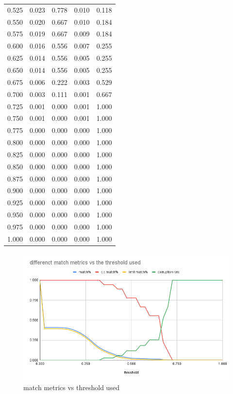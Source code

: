 \documentclass{article}
\begin{document}
\begin{table}[H]
\begin{tabular}{
  >{\columncolor[HTML]{FFE599}}c 
  >{\columncolor[HTML]{B6D7A8}}c 
  >{\columncolor[HTML]{9FC5E8}}c 
  >{\columncolor[HTML]{F9CB9C}}c 
  >{\columncolor[HTML]{D9D2E9}}c }
  0.525 & 0.023 & 0.778 & 0.010 & 0.118 \\
  0.550 & 0.020 & 0.667 & 0.010 & 0.184 \\
  0.575 & 0.019 & 0.667 & 0.009 & 0.184 \\
  0.600 & 0.016 & 0.556 & 0.007 & 0.255 \\
  0.625 & 0.014 & 0.556 & 0.005 & 0.255 \\
  0.650 & 0.014 & 0.556 & 0.005 & 0.255 \\
  0.675 & 0.006 & 0.222 & 0.003 & 0.529 \\
  0.700 & 0.003 & 0.111 & 0.001 & 0.667 \\
  0.725 & 0.001 & 0.000 & 0.001 & 1.000 \\
  0.750 & 0.001 & 0.000 & 0.001 & 1.000 \\
  0.775 & 0.000 & 0.000 & 0.000 & 1.000 \\
  0.800 & 0.000 & 0.000 & 0.000 & 1.000 \\
  0.825 & 0.000 & 0.000 & 0.000 & 1.000 \\
  0.850 & 0.000 & 0.000 & 0.000 & 1.000 \\
  0.875 & 0.000 & 0.000 & 0.000 & 1.000 \\
  0.900 & 0.000 & 0.000 & 0.000 & 1.000 \\
  0.925 & 0.000 & 0.000 & 0.000 & 1.000 \\
  0.950 & 0.000 & 0.000 & 0.000 & 1.000 \\
  0.975 & 0.000 & 0.000 & 0.000 & 1.000 \\
  1.000 & 0.000 & 0.000 & 0.000 & 1.000
  \end{tabular}
  \end{table}


\begin{figure}[H]
    \caption{match metrics vs threshold used}\label{fig:match_metrics_vs_threshold_used}
    \centering
    \includegraphics[height=0.5\textwidth]{pictures/match_metrics_vs_threshold_used.png}
\end{figure}
\end{document}
